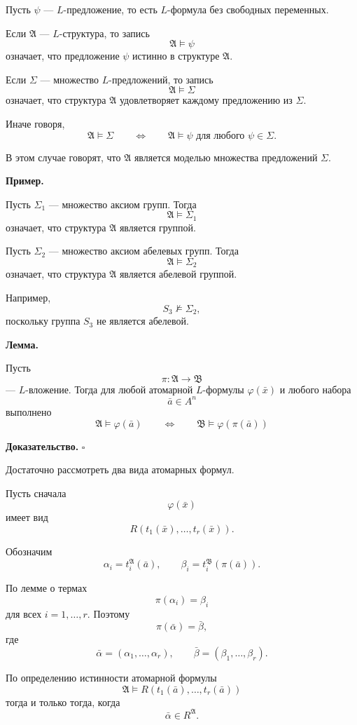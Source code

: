\documentclass[12pt,a4paper,oneside,openany]{book}
\theoremstyle{definition}
\theoremstyle{plain}
\theoremstyle{remark}
\begin{document}
Пусть $\psi$ — $L$-предложение, то есть $L$-формула без свободных переменных.

Если $\mathfrak A$ — $L$-структура, то запись
\[
\mathfrak A\models \psi
\]
означает, что предложение $\psi$ истинно в структуре $\mathfrak A$.

Если $\Sigma$ — множество $L$-предложений, то запись
\[
\mathfrak A\models \Sigma
\]
означает, что структура $\mathfrak A$ удовлетворяет каждому предложению из $\Sigma$.

Иначе говоря,
\[
\mathfrak A\models \Sigma
\qquad
\Longleftrightarrow
\qquad
\mathfrak A\models \psi
\text{ для любого } \psi\in\Sigma.
\]

В этом случае говорят, что $\mathfrak A$ является моделью множества предложений $\Sigma$.

\textbf{Пример.}

Пусть $\Sigma_1$ — множество аксиом групп. Тогда
\[
\mathfrak A\models \Sigma_1
\]
означает, что структура $\mathfrak A$ является группой.

Пусть $\Sigma_2$ — множество аксиом абелевых групп. Тогда
\[
\mathfrak A\models \Sigma_2
\]
означает, что структура $\mathfrak A$ является абелевой группой.

Например,
\[
S_3\not\models \Sigma_2,
\]
поскольку группа $S_3$ не является абелевой.
\par\medskip
\textbf{Лемма.}

Пусть
\[
\pi:\mathfrak A\to\mathfrak B
\]
— $L$-вложение. Тогда для любой атомарной $L$-формулы $\varphi(\bar x)$ и любого набора
\[
\bar a\in A^n
\]
выполнено
\[
\mathfrak A\models \varphi(\bar a)
\qquad
\Longleftrightarrow
\qquad
\mathfrak B\models \varphi(\pi(\bar a))
\]

\textbf{Доказательство.} $\square$

Достаточно рассмотреть два вида атомарных формул.

Пусть сначала
\[
\varphi(\bar x)
\]
имеет вид
\[
R(t_1(\bar x),\ldots,t_r(\bar x)).
\]

Обозначим
\[
\alpha_i=t_i^{\mathfrak A}(\bar a),
\qquad
\beta_i=t_i^{\mathfrak B}(\pi(\bar a)).
\]

По лемме о термах
\[
\pi(\alpha_i)=\beta_i
\]
для всех $i=1,\ldots,r$. Поэтому
\[
\pi(\bar \alpha)=\bar \beta,
\]
где
\[
\bar \alpha=(\alpha_1,\ldots,\alpha_r),
\qquad
\bar \beta=(\beta_1,\ldots,\beta_r).
\]

По определению истинности атомарной формулы
\[
\mathfrak A\models R(t_1(\bar a),\ldots,t_r(\bar a))
\]
тогда и только тогда, когда
\[
\bar \alpha\in R^{\mathfrak A}.
\]
\end{document}
